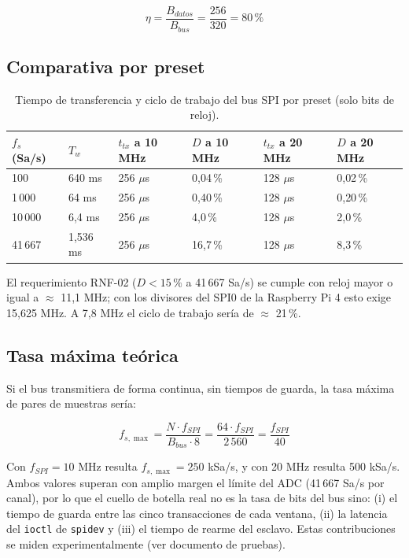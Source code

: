 \documentclass[12pt,a4paper]{article}
\begin{document}
\begin{equation}
\eta = \frac{B_{datos}}{B_{bus}} = \frac{256}{320} = 80\,\%
\end{equation}

\subsection{Comparativa por preset}

\begin{table}[H]
\centering
\small
\begin{tabular}{@{}p{2.2cm} p{2.3cm} p{2.6cm} p{2.6cm} p{2.6cm} p{2.6cm}@{}}
\toprule
\textbf{$f_s$ (Sa/s)} & \textbf{$T_w$} & \textbf{$t_{tx}$ a 10 MHz} & \textbf{$D$ a 10 MHz} & \textbf{$t_{tx}$ a 20 MHz} & \textbf{$D$ a 20 MHz} \\
\midrule
100     & 640 ms    & 256 $\mu$s & 0{,}04\,\% & 128 $\mu$s & 0{,}02\,\% \\
1\,000  & 64 ms     & 256 $\mu$s & 0{,}40\,\% & 128 $\mu$s & 0{,}20\,\% \\
10\,000 & 6{,}4 ms  & 256 $\mu$s & 4{,}0\,\%  & 128 $\mu$s & 2{,}0\,\% \\
41\,667 & 1{,}536 ms & 256 $\mu$s & 16{,}7\,\% & 128 $\mu$s & 8{,}3\,\% \\
\bottomrule
\end{tabular}
\caption{Tiempo de transferencia y ciclo de trabajo del bus SPI por preset (solo bits de reloj).}
\end{table}

El requerimiento RNF-02 ($D < 15\,\%$ a 41\,667 Sa/s) se cumple con reloj mayor o igual a $\approx$ 11{,}1 MHz; con los divisores del SPI0 de la Raspberry Pi 4 esto exige 15{,}625 MHz. A 7{,}8 MHz el ciclo de trabajo sería de $\approx$ 21\,\%.

\subsection{Tasa máxima teórica}

Si el bus transmitiera de forma continua, sin tiempos de guarda, la tasa máxima de pares de muestras sería:

\begin{equation}
f_{s,\max} = \frac{N \cdot f_{SPI}}{B_{bus} \cdot 8} = \frac{64 \cdot f_{SPI}}{2\,560} = \frac{f_{SPI}}{40}
\end{equation}

Con $f_{SPI} = 10$ MHz resulta $f_{s,\max} = 250$ kSa/s, y con 20 MHz resulta 500 kSa/s. Ambos valores superan con amplio margen el límite del ADC (41\,667 Sa/s por canal), por lo que el cuello de botella real no es la tasa de bits del bus sino: (i) el tiempo de guarda entre las cinco transacciones de cada ventana, (ii) la latencia del \texttt{ioctl} de \texttt{spidev} y (iii) el tiempo de rearme del esclavo. Estas contribuciones se miden experimentalmente (ver documento de pruebas).
\end{document}
